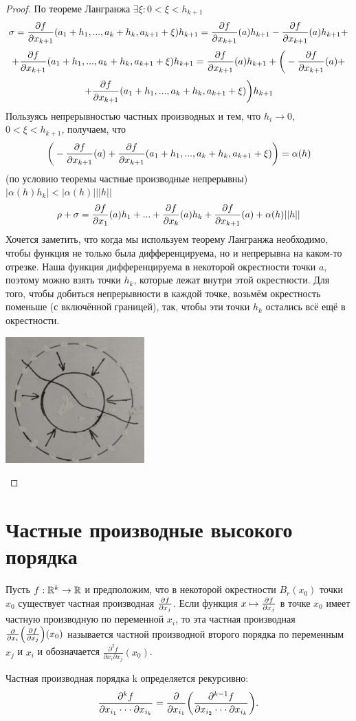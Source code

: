 \begin{proof}
    	По теореме Лангранжа $\exists \xi: 0 < \xi < h_{k + 1}$
    	\[ \sigma = \frac{\partial f}{\partial x_{k + 1}}(a_1 + h_1, ..., a_k + h_k, a_{k + 1} + \xi) h_{k + 1} = \frac{\partial f}{\partial x_{k + 1}}(a)h_{k + 1} - \frac{\partial f}{\partial x_{k + 1}}(a)h_{k + 1} + \]
    	\[ + \frac{\partial f}{\partial x_{k + 1}}(a_1 + h_1, ..., a_k + h_k, a_{k + 1} + \xi)h_{k + 1} = \frac{\partial f}{\partial x_{k + 1}}(a)h_{k + 1} + \bigg(-\frac{\partial f}{\partial x_{k + 1}}(a) + \]
    	\[ + \frac{\partial f}{\partial x_{k + 1}}(a_1 + h_1, ..., a_k + h_k, a_{k + 1} + \xi)\bigg)h_{k + 1} \]
    	Пользуясь непрерывностью частных производных и тем, что $h_i \to 0$, $0 < \xi < h_{k + 1}$, получаем, что
    	\[ \bigg(-\frac{\partial f}{\partial x_{k + 1}}(a) + \frac{\partial f}{\partial x_{k + 1}}(a_1 + h_1, ..., a_k + h_k, a_{k + 1} + \xi)\bigg) = \alpha(h) \]
    	(по условию теоремы частные производные непрерывны)
    	$|\alpha(h) h_k| < |\alpha(h)| ||h||$
    	\[ \rho + \sigma = \frac{\partial f}{\partial x_1}(a)h_1 + ... + \frac{\partial f}{\partial x_k}(a)h_k + \frac{\partial f}{\partial x_{k + 1}}(a) + \alpha(h) ||h|| \]
    	Хочется заметить, что когда мы используем теорему Лангранжа необходимо, чтобы функция не только была дифференцируема, но и непрерывна на каком-то отрезке. Наша функция дифференцируема в некоторой окрестности точки $a$, поэтому можно взять точки $h_k$, которые лежат внутри этой окрестности. Для того, чтобы добиться непрерывности в каждой точке, возьмём окрестность поменьше (с включённой границей), так, чтобы эти точки $h_k$ остались всё ещё в окрестности.
    	\begin{center}
    		\includegraphics[width=0.4\textwidth]{img/lecture37/circle}
    	\end{center}
    \end{proof}
    
    \section{Частные производные высокого порядка}
    
    \begin{definition}
    	Пусть $f : \mathbb R^k \rightarrow \mathbb R$ и предположим, что в некоторой окрестности $B_r(x_0)$ точки $x_0$ существует частная производная $\pdv{f}{x_j}$. Если функция $x \mapsto \pdv{f}{x_j}$ в точке $x_0$ имеет частную производную по переменной $x_i$, то эта частная производная $\pdv{x_i}(\pdv{f}{x_j})(x_0)$ называется частной производной второго порядка по переменным $x_j$ и $x_i$ и обозначается $\frac{\partial^2 f}{\partial x_i \partial x_j}(x_0)$. 
    	    	
    	Частная производная порядка k определяется рекурсивно:
    	\[ \frac{\partial^k f}{\partial x_{i_1} \cdot \cdot \cdot \partial x_{i_k}} = \pdv{x_{i_1}}(\frac{\partial^{k - 1} f}{\partial x_{i_2} \cdot \cdot \cdot \partial x_{i_k}}). \]
    \end{definition}
    
